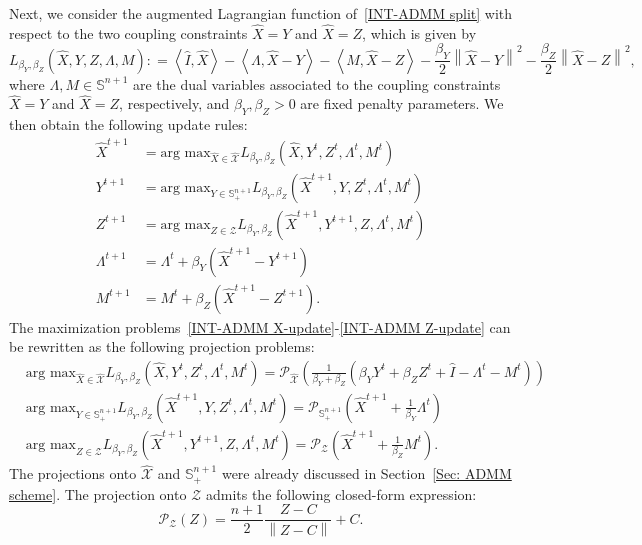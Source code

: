 \documentclass[11pt, a4paper]{article}
\newcommand{\IP}[2]{\left\langle #1, #2 \right\rangle}
\newcommand{\eqdef}{\mathrel{\mathop:}=}
\newcommand{\argmax}{\text{arg max}}
\newcommand\norm[1]{\left\lVert#1\right\rVert}
\newcommand{\mc}{\mathcal}
\newcommand{\aug}[1]{\hat{#1}}
\begin{document}
Next, we consider the augmented Lagrangian function of~\eqref{INT-ADMM split} with respect to the two coupling constraints $\aug{X} = Y$ and $\aug{X} = Z$, which is given by
\begin{equation}
    L_{\beta_Y, \beta_Z}(\aug{X}, Y, Z, \Lambda, M) \eqdef \IP{\aug{I}}{\aug{X}} - \IP{\Lambda}{\aug{X}-Y} - \IP{M}{\aug{X}-Z} - \frac{\beta_Y}{2}\norm{\aug{X}-Y}^2 - \frac{\beta_Z}{2}\norm{\aug{X}-Z}^2, \label{INT-ADMM augmented Lagrangian}
\end{equation}
where $\Lambda, M \in \mathbb{S}^{n+1}$ are the dual variables associated to the coupling constraints $\aug{X}=Y$ and $\aug{X}=Z$, respectively, and $\beta_Y, \beta_Z > 0$ are fixed penalty parameters.
We then obtain the following update rules:
\begin{align}
    \aug{X}^{t+1} &= \argmax_{\aug{X} \in \aug{\mc{X}}} L_{\beta_Y, \beta_Z}(\aug{X},Y^t,Z^t,\Lambda^t,M^t) \label{INT-ADMM X-update}\\
    Y^{t+1} &= \argmax_{Y \in \mathbb{S}^{n+1}_+} L_{\beta_Y, \beta_Z}(\aug{X}^{t+1},Y,Z^t,\Lambda^t,M^t) \label{INT-ADMM Y-update}\\
    Z^{t+1} &= \argmax_{Z \in \mc{Z}} L_{\beta_Y, \beta_Z}(\aug{X}^{t+1},Y^{t+1},Z,\Lambda^t,M^t) \label{INT-ADMM Z-update}\\
    \Lambda^{t+1} &= \Lambda^t + \beta_Y (\aug{X}^{t+1}-Y^{t+1}) \label{INT-ADMM L-update}\\
    M^{t+1} &= M^t + \beta_Z (\aug{X}^{t+1}-Z^{t+1}). \label{INT-ADMM M-update}
\end{align}
The maximization problems~\eqref{INT-ADMM X-update}-\eqref{INT-ADMM Z-update} can be rewritten as the following projection problems:
\begin{align}
    & \argmax_{\aug{X} \in \aug{\mc{X}}} L_{\beta_Y, \beta_Z}(\aug{X},Y^t,Z^t,\Lambda^t,M^t) = \mc{P}_{\mc{\aug{X}}}\left(\frac{1}{\beta_Y + \beta_Z}\left(\beta_Y Y^t + \beta_Z Z^t + \aug{I} - \Lambda^t - M^t\right)\right) \label{INT-ADMM X-projection}\\
    & \argmax_{Y \in \mathbb{S}^{n+1}_+} L_{\beta_Y, \beta_Z}(\aug{X}^{t+1},Y,Z^t,\Lambda^t,M^t) = \mc{P}_{ \mathbb{S}^{n+1}_+}\left(\aug{X}^{t+1} + \frac{1}{\beta_Y}\Lambda^t\right) \label{INT-ADMM Y-projection}\\
    & \argmax_{Z \in \mc{Z}} L_{\beta_Y, \beta_Z}(\aug{X}^{t+1},Y^{t+1},Z,\Lambda^t,M^t) = \mc{P}_{\mc{Z}}\left(\aug{X}^{t+1} + \frac{1}{\beta_Z}M^t\right). \label{INT-ADMM Z-projection}
\end{align}
The projections onto $\aug{\mc{X}}$ and $\mathbb{S}^{n+1}_+$ were already discussed in Section~\ref{Sec: ADMM scheme}.
The projection onto $\mc{Z}$ admits the following closed-form expression:
\begin{equation}
    \mc{P}_{\mc{Z}}(Z) = \frac{n+1}{2} \frac{Z-C}{\norm{Z-C}} + C.
\end{equation}
\end{document}
